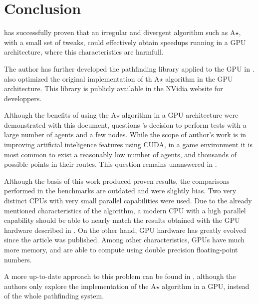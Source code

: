 \section{Conclusion}

\cite{bleiweiss08} has successfully proven that an irregular and divergent algorithm such as A$\star$, with a small set of tweaks, could effectively obtain speedups running in a GPU architecture, where this characteristics are harmfull.

The author has further developed the pathfinding library applied to the GPU in \cite{bleiweiss09}. \cite{inam10} also optimized the original implementation of th A$\star$ algorithm in the GPU architecture. This library is publicly available in the NVidia website for developpers.

Although the benefits of using the A$\star$ algorithm in a GPU architecture were demonstrated with this document, \cite{johansson09} questions \citeauthor{bleiweiss08}'s decision to perform tests with a large number of agents and a few nodes.
While the scope of author's work is in improving artificial inteligence features using CUDA, in a game environment it is most common to exist a reasonably low number of agents, and thousands of possible points in their routes. This question remains unanswered in \cite{bleiweiss09}.

Although the basis of this work produced proven results, the comparisons performed in the benchmarks are outdated and were slightly bias. Two very distinct CPUs with very small parallel capabilities were used. Due to the already mentioned characteristics of the algorithm, a modern CPU with a high parallel capability should be able to nearly match the results obtained with the GPU hardware described in \cite{bleiweiss08}. On the other hand, GPU hardware has greatly evolved since the article was published. Among other characteristics, GPUs have much more memory, and are able to compute using double precision floating-point numbers.

A more up-to-date approach to this problem can be found in \cite{inam10}, although the authors only explore the implementation of the A$\star$ algorithm in a GPU, instead of the whole pathfinding system.